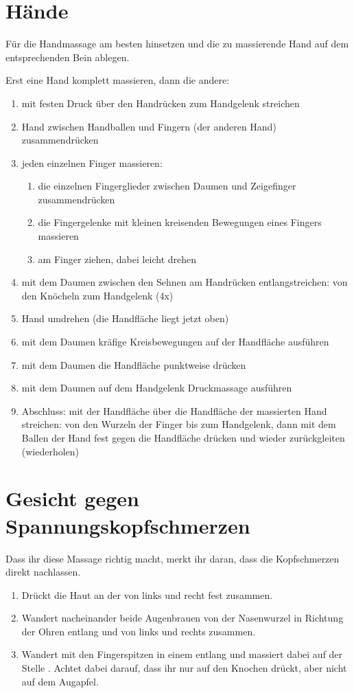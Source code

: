 \section{Hände}
Für die Handmassage am besten hinsetzen und die zu massierende Hand auf dem entsprechenden Bein ablegen.

Erst eine Hand komplett massieren, dann die andere:
\begin{enumerate}
  \item mit festen Druck über den Handrücken zum Handgelenk streichen
  \item Hand zwischen Handballen und Fingern (der anderen Hand) zu\-sam\-men\-drü\-cken
  \item jeden einzelnen Finger massieren:
    \begin{enumerate}
      \item die einzelnen Fingerglieder zwischen Daumen und Zeigefinger zu\-sam\-men\-drü\-cken
      \item die Fingergelenke mit kleinen kreisenden Bewegungen eines Fingers massieren
      \item am Finger ziehen, dabei leicht drehen
    \end{enumerate}
  \item mit dem Daumen zwischen den Sehnen am Handrücken entlangstreichen: von den Knöcheln zum Handgelenk (4x)
  \item Hand umdrehen (die Handfläche liegt jetzt oben)
  \item mit dem Daumen kräfige Kreisbewegungen auf der Handfläche ausführen
  \item mit dem Daumen die Handfläche punktweise drücken
  \item mit dem Daumen auf dem Handgelenk Druckmassage ausführen
  \item Abschluss: mit der Handfläche über die Handfläche der massierten Hand streichen: von den Wurzeln der Finger bis zum Handgelenk, dann mit dem Ballen der Hand fest gegen die Handfläche drücken und wieder zurückgleiten (wiederholen)
\end{enumerate}

\section{Gesicht gegen Spannungskopfschmerzen}

Dass ihr diese Massage richtig macht, merkt ihr daran, dass die Kopfschmerzen direkt nachlassen.

\begin{enumerate}
  \item Drückt die Haut an der  von links und recht fest zusammen.
  \item Wandert nacheinander beide Augenbrauen von der Nasenwurzel in Richtung der Ohren entlang und  von links und rechts zusammen.
  \item Wandert mit den Fingerspitzen in einem  entlang und massiert dabei auf der Stelle . Achtet dabei darauf, dass ihr nur auf den Knochen drückt, aber nicht auf dem Augapfel.
\end{enumerate}
